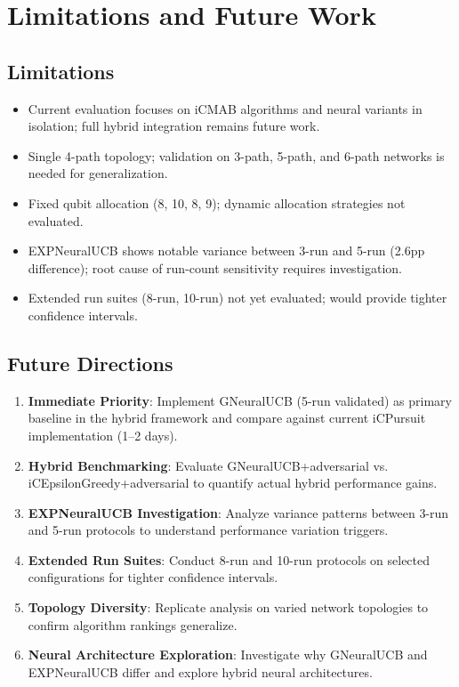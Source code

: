 \documentclass[12pt,a4paper]{article}
\begin{document}
\section{Limitations and Future Work}

\subsection{Limitations}
\begin{itemize}
\item Current evaluation focuses on iCMAB algorithms and neural variants in isolation; full hybrid integration remains future work.
\item Single 4-path topology; validation on 3-path, 5-path, and 6-path networks is needed for generalization.
\item Fixed qubit allocation (8, 10, 8, 9); dynamic allocation strategies not evaluated.
\item EXPNeuralUCB shows notable variance between 3-run and 5-run (2.6pp difference); root cause of run-count sensitivity requires investigation.
\item Extended run suites (8-run, 10-run) not yet evaluated; would provide tighter confidence intervals.
\end{itemize}

\subsection{Future Directions}
\begin{enumerate}
\item \textbf{Immediate Priority}: Implement GNeuralUCB (5-run validated) as primary baseline in the hybrid framework and compare against current iCPursuit implementation (1--2 days).
\item \textbf{Hybrid Benchmarking}: Evaluate GNeuralUCB+adversarial vs. iCEpsilonGreedy+adversarial to quantify actual hybrid performance gains.
\item \textbf{EXPNeuralUCB Investigation}: Analyze variance patterns between 3-run and 5-run protocols to understand performance variation triggers.
\item \textbf{Extended Run Suites}: Conduct 8-run and 10-run protocols on selected configurations for tighter confidence intervals.
\item \textbf{Topology Diversity}: Replicate analysis on varied network topologies to confirm algorithm rankings generalize.
\item \textbf{Neural Architecture Exploration}: Investigate why GNeuralUCB and EXPNeuralUCB differ and explore hybrid neural architectures.
\end{enumerate}
\end{document}
